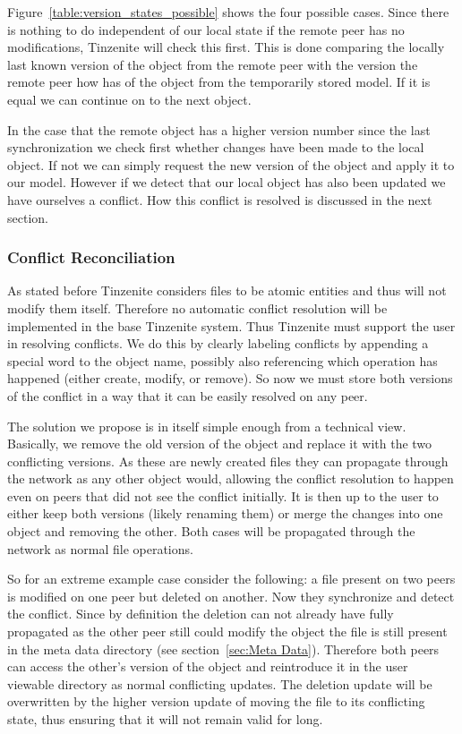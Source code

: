 Figure~\ref{table:version_states_possible} shows the four possible cases.
Since there is nothing to do independent of our local state if the remote peer has no modifications, Tinzenite will check this first.
This is done comparing the locally last known version of the object from the remote peer with the version the remote peer how has of the object from the temporarily stored model.
If it is equal we can continue on to the next object.

In the case that the remote object has a higher version number since the last synchronization we check first whether changes have been made to the local object.
If not we can simply request the new version of the object and apply it to our model.
However if we detect that our local object has also been updated we have ourselves a conflict.
How this conflict is resolved is discussed in the next section.

\subsubsection{Conflict Reconciliation}
\label{subs:Conflict Reconciliation}

As stated before Tinzenite considers files to be atomic entities and thus will not modify them itself.
Therefore no automatic conflict resolution will be implemented in the base Tinzenite system.
Thus Tinzenite must support the user in resolving conflicts.
We do this by clearly labeling conflicts by appending a special word to the object name, possibly also referencing which operation has happened (either create, modify, or remove).
So now we must store both versions of the conflict in a way that it can be easily resolved on any peer.

The solution we propose is in itself simple enough from a technical view.
Basically, we remove the old version of the object and replace it with the two conflicting versions.
As these are newly created files they can propagate through the network as any other object would, allowing the conflict resolution to happen even on peers that did not see the conflict initially.
It is then up to the user to either keep both versions (likely renaming them) or merge the changes into one object and removing the other.
Both cases will be propagated through the network as normal file operations.

So for an extreme example case consider the following: a file present on two peers is modified on one peer but deleted on another.
Now they synchronize and detect the conflict.
Since by definition the deletion can not already have fully propagated as the other peer still could modify the object the file is still present in the meta data directory (see section~\ref{sec:Meta Data}).
Therefore both peers can access the other's version of the object and reintroduce it in the user viewable directory as normal conflicting updates.
The deletion update will be overwritten by the higher version update of moving the file to its conflicting state, thus ensuring that it will not remain valid for long.

